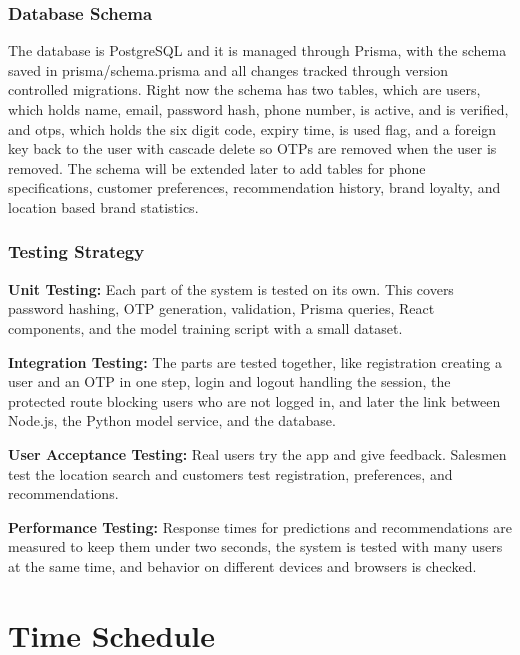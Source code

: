 \documentclass[12pt, a4paper]{report}
\numberwithin{equation}{chapter}
\begin{document}
\subsection{Database Schema}

The database is PostgreSQL and it is managed through Prisma, with the schema saved in prisma/schema.prisma and all changes tracked through version controlled migrations. Right now the schema has two tables, which are users, which holds name, email, password hash, phone number, is active, and is verified, and otps, which holds the six digit code, expiry time, is used flag, and a foreign key back to the user with cascade delete so OTPs are removed when the user is removed. The schema will be extended later to add tables for phone specifications, customer preferences, recommendation history, brand loyalty, and location based brand statistics.

\subsection{Testing Strategy}

\textbf{Unit Testing:} Each part of the system is tested on its own. This covers password hashing, OTP generation, validation, Prisma queries, React components, and the model training script with a small dataset.

\textbf{Integration Testing:} The parts are tested together, like registration creating a user and an OTP in one step, login and logout handling the session, the protected route blocking users who are not logged in, and later the link between Node.js, the Python model service, and the database.

\textbf{User Acceptance Testing:} Real users try the app and give feedback. Salesmen test the location search and customers test registration, preferences, and recommendations.

\textbf{Performance Testing:} Response times for predictions and recommendations are measured to keep them under two seconds, the system is tested with many users at the same time, and behavior on different devices and browsers is checked.

\chapter{Time Schedule}
\end{document}
